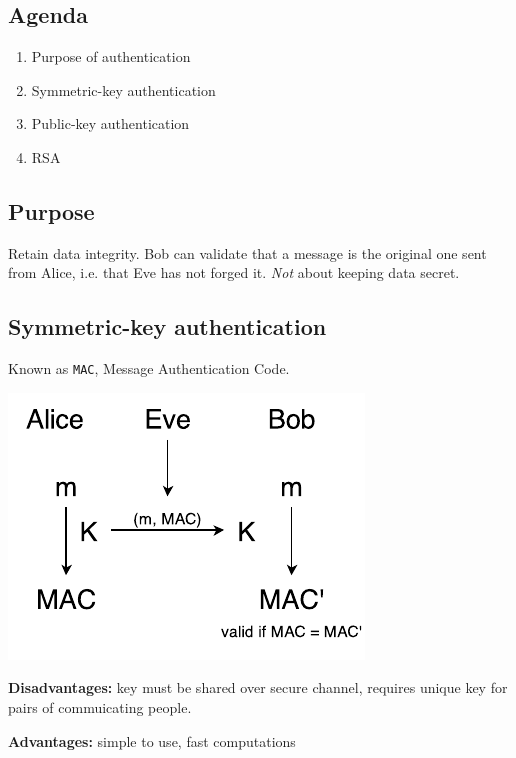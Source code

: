 

\subsection*{Agenda}
\begin{enumerate}
\item Purpose of authentication
\item Symmetric-key authentication
\item Public-key authentication
\item RSA
\end{enumerate}

\subsection{Purpose}
Retain data integrity. Bob can validate that a message is the original one sent from Alice, i.e. that Eve has not forged it. \emph{Not} about keeping data secret.

\subsection{Symmetric-key authentication}
Known as \texttt{MAC}, Message Authentication Code.

\begin{center}
\includegraphics{images/2-sym-AB.pdf}
\end{center}

\textbf{Disadvantages:} key must be shared over secure channel, requires unique key for pairs of commuicating people.

\textbf{Advantages:} simple to use, fast computations

